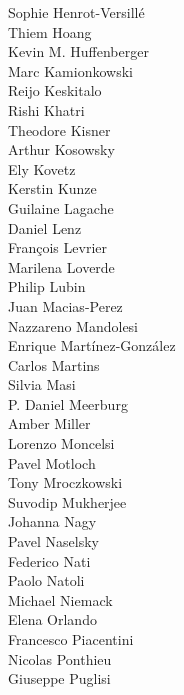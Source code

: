 \documentclass[PICOReport.tex]{subfiles}
\begin{document}
{\begin{multicols}{4}
Sophie Henrot-Versill\'e        \\
Thiem Hoang                     \\
Kevin M. Huffenberger           \\
Marc Kamionkowski               \\
Reijo Keskitalo                 \\
Rishi Khatri                    \\
Theodore Kisner                 \\
Arthur Kosowsky                 \\
Ely Kovetz                      \\
Kerstin Kunze                   \\
Guilaine Lagache                \\
Daniel Lenz                     \\
Fran\c{c}ois Levrier            \\
Marilena Loverde                \\
Philip Lubin                    \\
Juan Macias-Perez               \\
Nazzareno Mandolesi             \\
Enrique Mart\'{i}nez-Gonz\'{a}lez   \\
Carlos Martins                  \\
Silvia Masi                     \\
P. Daniel Meerburg              \\
Amber Miller                    \\
Lorenzo Moncelsi                \\
Pavel Motloch                   \\
Tony Mroczkowski                \\
Suvodip Mukherjee               \\
Johanna Nagy                    \\
Pavel Naselsky                  \\
Federico Nati                   \\
Paolo Natoli                    \\
Michael Niemack                 \\
Elena Orlando                   \\
Francesco Piacentini            \\
Nicolas Ponthieu                \\
Giuseppe Puglisi                \\

\end{multicols}}
\end{document}
